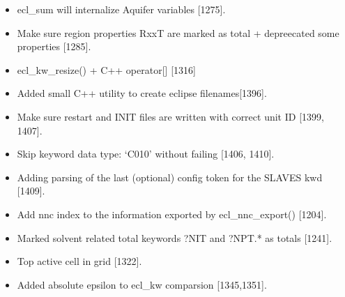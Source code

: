 \documentclass[letterpaper,10pt,english]{sphinxmanual}
\begin{document}
\begin{itemize}
\item {} 
ecl\_sum will internalize Aquifer variables {[}1275{]}.

\item {} 
Make sure region properties RxxT are marked as total + depreecated some properties {[}1285{]}.

\item {} 
ecl\_kw\_resize() + C++ operator{[}{]} {[}1316{]}

\item {} 
Added small C++ utility to create eclipse filenames{[}1396{]}.

\item {} 
Make sure restart and INIT files are written with correct unit ID {[}1399, 1407{]}.

\item {} 
Skip keyword data type: ‘C010’ without failing {[}1406, 1410{]}.

\item {} 
Adding parsing of the last (optional) config token for the SLAVES kwd {[}1409{]}.

\item {} 
Add nnc index to the information exported by ecl\_nnc\_export() {[}1204{]}.

\item {} 
Marked solvent related total keywords ?NIT and ?NPT.* as totals {[}1241{]}.

\item {} 
Top active cell in grid {[}1322{]}.

\item {} 
Added absolute epsilon to ecl\_kw comparsion {[}1345,1351{]}.

\end{itemize}
\end{document}
